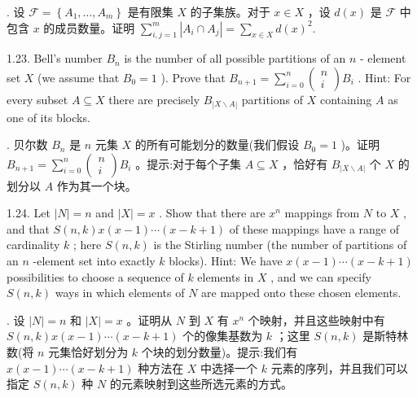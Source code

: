 \documentclass[10pt]{article}
\begin{document}
\begin{tcolorbox}. 设 \(\mathcal{F} = \left\{  {{A}_{1},\ldots ,{A}_{m}}\right\}\) 是有限集 \(X\) 的子集族。对于 \(x \in  X\) ，设 \(d\left( x\right)\) 是 \(\mathcal{F}\) 中包含 \(x\) 的成员数量。证明 \(\mathop{\sum }\limits_{{i,j = 1}}^{m}\left| {{A}_{i} \cap  {A}_{j}}\right|  = \mathop{\sum }\limits_{{x \in  X}}d{\left( x\right) }^{2}.\)
\end{tcolorbox}

1.23. Bell’s number \({B}_{n}\) is the number of all possible partitions of an \(n\) - element set \(X\) (we assume that \({B}_{0} = 1\) ). Prove that \({B}_{n + 1} = \mathop{\sum }\limits_{{i = 0}}^{n}\left( \begin{matrix} n \\  i \end{matrix}\right) {B}_{i}\) . Hint: For every subset \(A \subseteq  X\) there are precisely \({B}_{\left| X \smallsetminus  A\right| }\) partitions of \(X\) containing \(A\) as one of its blocks.

\begin{tcolorbox}. 贝尔数 \({B}_{n}\) 是 \(n\) 元集 \(X\) 的所有可能划分的数量(我们假设 \({B}_{0} = 1\) )。证明 \({B}_{n + 1} = \mathop{\sum }\limits_{{i = 0}}^{n}\left( \begin{matrix} n \\  i \end{matrix}\right) {B}_{i}\) 。提示:对于每个子集 \(A \subseteq  X\) ，恰好有 \({B}_{\left| X \smallsetminus  A\right| }\) 个 \(X\) 的划分以 \(A\) 作为其一个块。
\end{tcolorbox}

1.24. Let \(\left| N\right|  = n\) and \(\left| X\right|  = x\) . Show that there are \({x}^{n}\) mappings from \(N\) to \(X\) , and that \(S\left( {n,k}\right) x\left( {x - 1}\right) \cdots \left( {x - k + 1}\right)\) of these mappings have a range of cardinality \(k\) ; here \(S\left( {n,k}\right)\) is the Stirling number (the number of partitions of an \(n\) -element set into exactly \(k\) blocks). Hint: We have \(x\left( {x - 1}\right) \cdots \left( {x - k + 1}\right)\) possibilities to choose a sequence of \(k\) elements in \(X\) , and we can specify \(S\left( {n,k}\right)\) ways in which elements of \(N\) are mapped onto these chosen elements.

\begin{tcolorbox}. 设 \(\left| N\right|  = n\) 和 \(\left| X\right|  = x\) 。证明从 \(N\) 到 \(X\) 有 \({x}^{n}\) 个映射，并且这些映射中有 \(S\left( {n,k}\right) x\left( {x - 1}\right) \cdots \left( {x - k + 1}\right)\) 个的像集基数为 \(k\) ；这里 \(S\left( {n,k}\right)\) 是斯特林数(将 \(n\) 元集恰好划分为 \(k\) 个块的划分数量)。提示:我们有 \(x\left( {x - 1}\right) \cdots \left( {x - k + 1}\right)\) 种方法在 \(X\) 中选择一个 \(k\) 元素的序列，并且我们可以指定 \(S\left( {n,k}\right)\) 种 \(N\) 的元素映射到这些所选元素的方式。
\end{tcolorbox}
\end{document}
